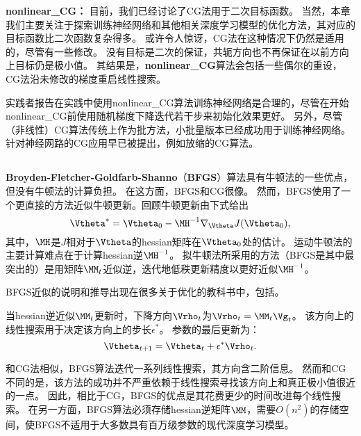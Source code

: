 \textbf{\gls{nonlinear_CG}：}
目前，我们已经讨论了\gls{CG}法用于二次目标函数。
当然，本章我们主要关注于探索训练神经网络和其他相关深度学习模型的优化方法，其对应的目标函数比二次函数复杂得多。
或许令人惊讶，\gls{CG}法在这种情况下仍然是适用的，尽管有一些修改。
没有目标是二次的保证，共轭方向也不再保证在以前方向上目标仍是极小值。
其结果是，\textbf{\gls{nonlinear_CG}}算法会包括一些偶尔的重设，\gls{CG}法沿未修改的梯度重启线性搜索。


实践者报告在实践中使用\gls{nonlinear_CG}算法训练神经网络是合理的，尽管在开始\gls{nonlinear_CG}前使用随机梯度下降迭代若干步来初始化效果更好。
另外，尽管（非线性）\gls{CG}算法传统上作为批方法，小批量版本已经成功用于训练神经网络\citep{LeRoux-chapter-2011}。
针对神经网路的\gls{CG}应用早已被提出，例如放缩的\gls{CG}算法\citep{Moller}。

\subsection{}
\label{sec:bfgs}
\textbf{Broyden-Fletcher-Goldfarb-Shanno}（\textbf{\gls{BFGS}}）算法具有牛顿法的一些优点，但没有牛顿法的计算负担。
在这方面，\gls{BFGS}和CG很像。
然而，\gls{BFGS}使用了一个更直接的方法近似牛顿更新。回顾牛顿更新由下式给出
\begin{equation}
    \Vtheta^* = \Vtheta_0 - \MH^{-1} \nabla_{\Vtheta} J(\Vtheta_0),
\end{equation}
其中，$\MH$是$J$相对于$\Vtheta$的\gls{hessian}矩阵在$\Vtheta_0$处的估计。
运动牛顿法的主要计算难点在于计算\gls{hessian}逆$\MH^{-1}$。
拟牛顿法所采用的方法（\gls{BFGS}是其中最突出的）是用矩阵$\MM_t$近似逆，迭代地低秩更新精度以更好近似$\MH^{-1}$。


\gls{BFGS}近似的说明和推导出现在很多关于优化的教科书中，包括\cite{Lue84}。

当\gls{hessian}逆近似$\MM_t$更新时，下降方向$\Vrho_t$为$\Vrho_t = \MM_t \Vg_t$。
该方向上的线性搜索用于决定该方向上的步长$\epsilon^*$。
参数的最后更新为：
\begin{equation}
    \Vtheta_{t+1} = \Vtheta_t + \epsilon^* \Vrho_t.
\end{equation}

和\gls{CG}法相似，\gls{BFGS}算法迭代一系列线性搜索，其方向含二阶信息。
然而和\gls{CG}不同的是，该方法的成功并不严重依赖于线性搜索寻找该方向上和真正极小值很近的一点。
因此，相比于\gls{CG}，\gls{BFGS}的优点是其花费更少的时间改进每个线性搜索。
在另一方面，\gls{BFGS}算法必须存储\gls{hessian}逆矩阵$\MM$，需要$O(n^2)$的存储空间，使\gls{BFGS}不适用于大多数具有百万级参数的现代深度学习模型。

